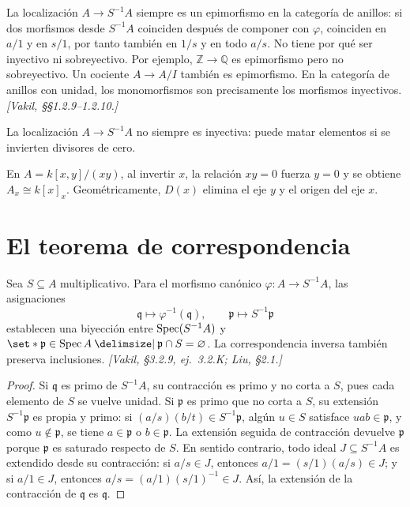 \begin{obs}
\label{obs:s03-epimorfismo-no-necesariamente-monomorfismo}
La localización $A\to S^{-1}A$ siempre es un epimorfismo en la categoría de anillos: si dos morfismos desde $S^{-1}A$ coinciden después de componer con $\varphi$, coinciden en $a/1$ y en $s/1$, por tanto también en $1/s$ y en todo $a/s$. No tiene por qué ser inyectivo ni sobreyectivo. Por ejemplo, $\mathbb Z\to\mathbb Q$ es epimorfismo pero no sobreyectivo. Un cociente $A\to A/I$ también es epimorfismo. En la categoría de anillos con unidad, los monomorfismos son precisamente los morfismos inyectivos. \emph{[Vakil, \S\S1.2.9--1.2.10.]}
\end{obs}

\begin{nota}[Advertencia]
La localización $A\to S^{-1}A$ no siempre es inyectiva: puede matar elementos si se invierten divisores de cero.
\end{nota}

\begin{ejem}
\label{ejem:s03-localizar-divisores-cero}
En $A=k[x,y]/(xy)$, al invertir $x$, la relación $xy=0$ fuerza $y=0$ y se obtiene $A_x\cong k[x]_x$. Geométricamente, $D(x)$ elimina el eje $y$ y el origen del eje $x$.
\end{ejem}

\section{El teorema de correspondencia}

\begin{teo}
\label{teo:s03-correspondencia-localizaciones}
Sea $S\subseteq A$ multiplicativo. Para el morfismo canónico $\varphi\colon A\to S^{-1}A$, las asignaciones
\[
\mathfrak q\longmapsto\varphi^{-1}(\mathfrak q),\qquad
\mathfrak p\longmapsto S^{-1}\mathfrak p
\]
establecen una biyección entre $\operatorname{Spec}(S^{-1}A)$ y $\set*{\mathfrak p\in\Spec A \given \mathfrak p\cap S=\varnothing}$. La correspondencia inversa también preserva inclusiones. \emph{[Vakil, \S3.2.9, ej.~3.2.K; Liu, \S2.1.]}
\end{teo}
\begin{proof}
Si $\mathfrak q$ es primo de $S^{-1}A$, su contracción es primo y no corta a $S$, pues cada elemento de $S$ se vuelve unidad. Si $\mathfrak p$ es primo que no corta a $S$, su extensión $S^{-1}\mathfrak p$ es propia y primo: si $(a/s)(b/t)\in S^{-1}\mathfrak p$, algún $u\in S$ satisface $uab\in\mathfrak p$, y como $u\notin\mathfrak p$, se tiene $a\in\mathfrak p$ o $b\in\mathfrak p$. La extensión seguida de contracción devuelve $\mathfrak p$ porque $\mathfrak p$ es saturado respecto de $S$. En sentido contrario, todo ideal $J\subseteq S^{-1}A$ es extendido desde su contracción: si $a/s\in J$, entonces $a/1=(s/1)(a/s)\in J$; y si $a/1\in J$, entonces $a/s=(a/1)(s/1)^{-1}\in J$. Así, la extensión de la contracción de $\mathfrak q$ es $\mathfrak q$.
\end{proof}

